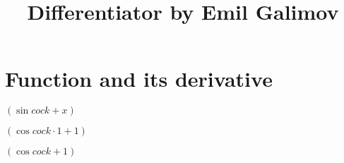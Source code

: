 \documentclass{article}
\title{Differentiator by Emil Galimov}
\begin{document}
\maketitle
\section{Function and its derivative}
\begin{center}
$( \sin{cock}+x)$\\
\end{center}
\begin{center}
$( \cos{cock} \cdot 1+1)$\\
\end{center}
\begin{center}
$( \cos{cock}+1)$\\
\end{center}
\end{document}
